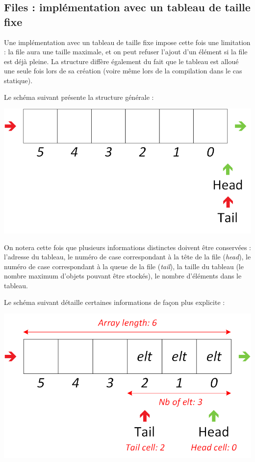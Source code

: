 \subsection{Files : implémentation avec un tableau de taille fixe}

\bigskip

Une implémentation avec un tableau de taille fixe impose cette fois une limitation : la file aura une taille maximale, et on peut refuser l'ajout d'un élément si la file est déjà pleine.
La structure diffère également du fait que le tableau est alloué une seule fois lors de sa création (voire même lors de la compilation dans le cas statique).

Le schéma suivant présente la structure générale :\\

\begin{center}
\includegraphics[scale=1]{Cours/Files_5_Tableau_Statique_Structure.png}
\end{center}

\smallskip

On notera cette fois que plusieurs informations distinctes doivent être conservées : l'adresse du tableau, le numéro de case correspondant à la tête de la file (\textit{head}), le numéro de case correspondant à la queue de la file (\textit{tail}), la taille du tableau (le nombre maximum d'objets pouvant être stockés), le nombre d'éléments dans le tableau.

Le schéma suivant détaille certaines informations de façon plus explicite :\\

\begin{center}
\includegraphics[scale=1]{Cours/Files_5_Tableau_Statique_Structure_Detaillee_1.png}
\end{center}

